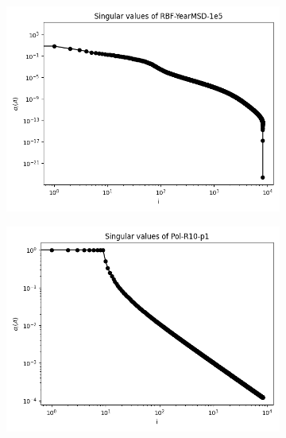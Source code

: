 \documentclass{article}
\theoremstyle{definition}
\begin{document}
\begin{figure}
\begin{subfigure}[t]{\textwidth+20pt\relax}
    \includegraphics[width=\dimexpr\linewidth-20pt\relax]{plots/singular_values/singular_values_RBF-YearMSD-1e5.png}
\end{subfigure}
\begin{subfigure}[t]{\textwidth+20pt\relax}
    \includegraphics[width=\dimexpr\linewidth-20pt\relax]{plots/singular_values/singular_values_Pol-R10-p1.png}
\end{subfigure}
\begin{subfigure}[t]{\textwidth+20pt\relax}

\end{subfigure}
\end{figure}
\end{document}
